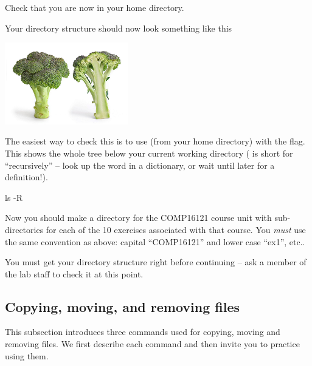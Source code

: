 Check that you are now in your home directory.

Your directory structure should now look something like this
     \begin{center}
       \includegraphics[width=0.4\textwidth]{images/broccoli} %
     \end{center}

     
The easiest way to check this is to use (from your home directory)
 with the  flag. This shows the whole tree
below your current working directory ( is short for
``recursively''  -- look up the word in a dictionary, or wait until later for a
 definition!).

\begin{ttoutenv}
  ls -R \return
\end{ttoutenv}
%

  Now you should make a directory for the COMP16121 course unit
  with
  sub-directories for each of the 10 exercises associated with that
  course. You \emph{must} use the same convention as above:
  capital ``COMP16121'' and lower case ``ex1'', etc..

You must get your directory structure right before continuing -- ask a
member of the lab staff to check it at this point.


\subsection{Copying, moving, and removing files}

This subsection introduces three commands used for copying, moving and
removing files. We first describe each command and then invite you to
practice using them.

